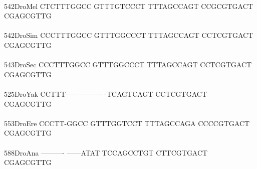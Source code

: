 \documentclass[11pt,twoside,reqno,a4paper]{article}
\begin{document}
{\\
542\hspace*{1\charwidth}DroMel	CTCTTTGGCC	GTTTGTCCCT	TTTAGCCAGT	CCGCGTGACT	CGAGCGTTG\\
\hspace*{4\charwidth}\hspace*{7\charwidth}\hspace*{1\charwidth}\hspace*{1\charwidth}\hspace*{1\charwidth}\hspace*{1\charwidth}\\
542\hspace*{1\charwidth}DroSim	CCCTTTGGCC	GTTTGGCCCT	TTTAGCCAGT	CCTCGTGACT	CGAGCGTTG\\
\hspace*{4\charwidth}\hspace*{7\charwidth}\hspace*{1\charwidth}\hspace*{1\charwidth}\hspace*{1\charwidth}\hspace*{1\charwidth}\\
543\hspace*{1\charwidth}DroSec	CCCTTTGGCC	GTTTGGCCCT	TTTAGCCAGT	CCTCGTGACT	CGAGCGTTG\\
\hspace*{4\charwidth}\hspace*{7\charwidth}\hspace*{1\charwidth}\hspace*{1\charwidth}\hspace*{1\charwidth}\hspace*{1\charwidth}\\
525\hspace*{1\charwidth}DroYak	CCTTT-----	----------	-TCAGTCAGT	CCTCGTGACT	CGAGCGTTG\\
\hspace*{4\charwidth}\hspace*{7\charwidth}\hspace*{1\charwidth}\hspace*{1\charwidth}\hspace*{1\charwidth}\hspace*{1\charwidth}\\
553\hspace*{1\charwidth}DroEre	CCCTT-GGCC	GTTTGGTCCT	TTTAGCCAGA	CCCCGTGACT	CGAGCGTTG\\
\hspace*{4\charwidth}\hspace*{7\charwidth}\hspace*{1\charwidth}\hspace*{1\charwidth}\hspace*{1\charwidth}\hspace*{1\charwidth}\\
588\hspace*{1\charwidth}DroAna	----------	------ATAT	TCCAGCCTGT	CTTCGTGACT	CGAGCGTTG\\
\hspace*{4\charwidth}\hspace*{7\charwidth}\hspace*{1\charwidth}\hspace*{1\charwidth}\hspace*{1\charwidth}\hspace*{1\charwidth}\\
\\
}
\end{document}
